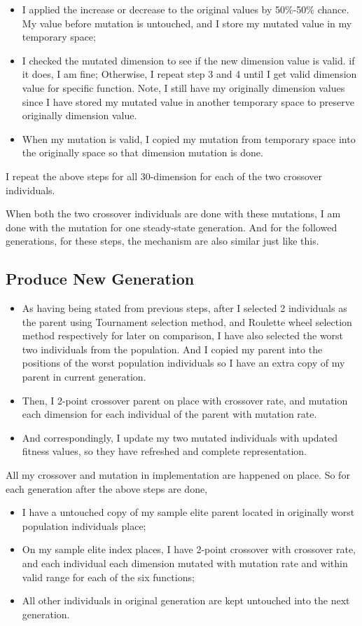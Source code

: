 \documentclass[10pt,b5paper]{article}
\begin{document}
\begin{itemize}
\item I applied the increase or decrease to the original values by 50\%-50\% chance. My value before mutation is untouched, and I store my mutated value in my temporary space;
\item I checked the mutated dimension to see if the new dimension value is valid. if it does, I am fine; Otherwise, I repeat step 3 and 4 until I get valid dimension value for specific function. Note, I still have my originally dimension values since I have stored my mutated value in another temporary space to preserve originally dimension value.
\item When my mutation is valid, I copied my mutation from temporary space into the originally space so that dimension mutation is done.
\end{itemize}

I repeat the above steps for all 30-dimension for each of the two crossover individuals.

When both the two crossover individuals are done with these mutations, I am done with the mutation for one steady-state generation. And for the followed generations, for these steps, the mechanism are also similar just like this. 
\subsection{Produce New Generation}
\label{sec-2-10}
\begin{itemize}
\item As having being stated from previous steps, after I selected 2 individuals as the parent using Tournament selection method, and Roulette wheel selection method respectively for later on comparison, I have also selected the worst two individuals from the population. And I copied my parent into the positions of the worst population individuals so I have an extra copy of my parent in current generation.
\item Then, I 2-point crossover parent on place with crossover rate, and mutation each dimension for each individual of the parent with mutation rate.
\item And correspondingly, I update my two mutated individuals with updated fitness values, so they have refreshed and complete representation.
\end{itemize}
All my crossover and mutation in implementation are happened on place. So for each generation after the above steps are done,
\begin{itemize}
\item I have a untouched copy of my sample elite parent located in originally worst population individuals place;
\item On my sample elite index places, I have 2-point crossover with crossover rate, and each individual each dimension mutated with mutation rate and within valid range for each of the six functions;
\item All other individuals in original generation are kept untouched into the next generation.
\end{itemize}
\end{document}
